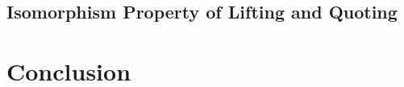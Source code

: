\documentclass{article}
\begin{document}
\subsection{Isomorphism Property of Lifting and Quoting}





\section{Conclusion}





\printbibliography
\end{document}
